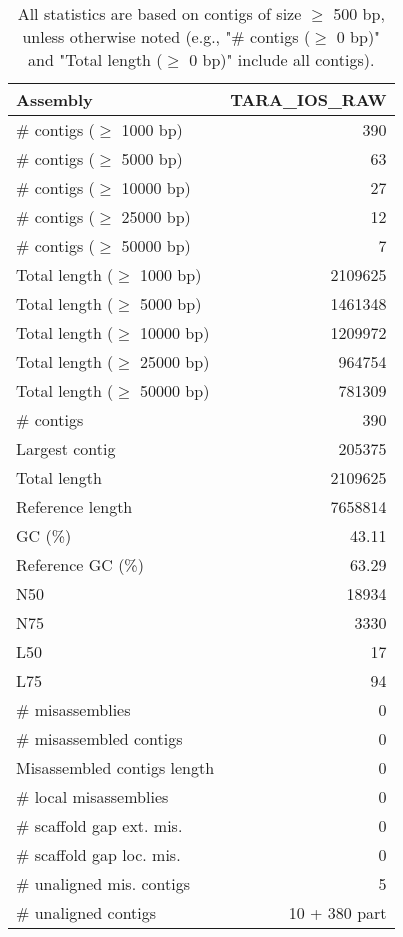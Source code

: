 \documentclass[12pt,a4paper]{article}
\begin{document}
\begin{table}[ht]
\begin{center}
\caption{All statistics are based on contigs of size $\geq$ 500 bp, unless otherwise noted (e.g., "\# contigs ($\geq$ 0 bp)" and "Total length ($\geq$ 0 bp)" include all contigs).}
\begin{tabular}{|l*{1}{|r}|}
\hline
Assembly & TARA\_IOS\_RAW \\ \hline
\# contigs ($\geq$ 1000 bp) & 390 \\ \hline
\# contigs ($\geq$ 5000 bp) & 63 \\ \hline
\# contigs ($\geq$ 10000 bp) & 27 \\ \hline
\# contigs ($\geq$ 25000 bp) & 12 \\ \hline
\# contigs ($\geq$ 50000 bp) & 7 \\ \hline
Total length ($\geq$ 1000 bp) & 2109625 \\ \hline
Total length ($\geq$ 5000 bp) & 1461348 \\ \hline
Total length ($\geq$ 10000 bp) & 1209972 \\ \hline
Total length ($\geq$ 25000 bp) & 964754 \\ \hline
Total length ($\geq$ 50000 bp) & 781309 \\ \hline
\# contigs & 390 \\ \hline
Largest contig & 205375 \\ \hline
Total length & 2109625 \\ \hline
Reference length & 7658814 \\ \hline
GC (\%) & 43.11 \\ \hline
Reference GC (\%) & 63.29 \\ \hline
N50 & 18934 \\ \hline
N75 & 3330 \\ \hline
L50 & 17 \\ \hline
L75 & 94 \\ \hline
\# misassemblies & 0 \\ \hline
\# misassembled contigs & 0 \\ \hline
Misassembled contigs length & 0 \\ \hline
\# local misassemblies & 0 \\ \hline
\# scaffold gap ext. mis. & 0 \\ \hline
\# scaffold gap loc. mis. & 0 \\ \hline
\# unaligned mis. contigs & 5 \\ \hline
\# unaligned contigs & 10 + 380 part \\ \hline

\end{tabular}
\end{center}
\end{table}
\end{document}
